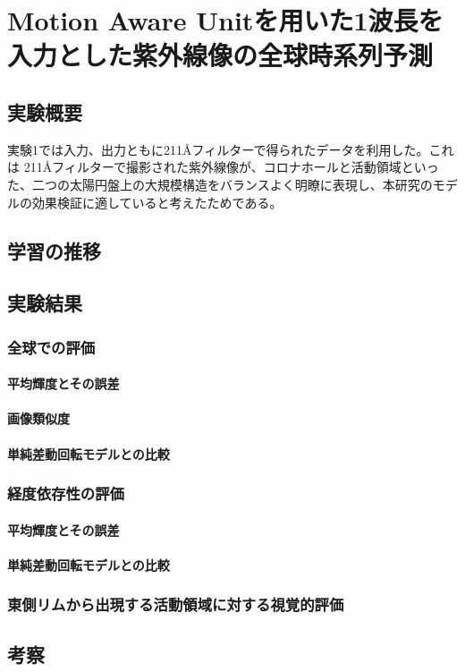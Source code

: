 \chapter{Motion Aware Unitを用いた1波長を入力とした紫外線像の全球時系列予測}
  \section{実験概要}
  実験1では入力、出力ともに211Åフィルターで得られたデータを利用した。これは 211Åフィルターで撮影された紫外線像が、コロナホールと活動領域といった、二つの太陽円盤上の大規模構造をバランスよく明瞭に表現し、本研究のモデルの効果検証に適していると考えたためである。
  \section{学習の推移}
  \section{実験結果}
    \subsection{全球での評価}
      \subsubsection{平均輝度とその誤差}
      \subsubsection{画像類似度}
      \subsubsection{単純差動回転モデルとの比較}
      \subsection{経度依存性の評価}
        \subsubsection{平均輝度とその誤差}
        \subsubsection{単純差動回転モデルとの比較}
    \subsection{東側リムから出現する活動領域に対する視覚的評価}
  \section{考察}
